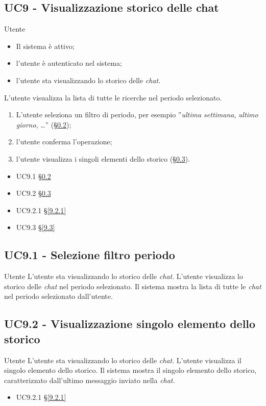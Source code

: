 \subsection{UC9 - Visualizzazione storico delle chat}
\label{9}
\makeUC{}
{Utente}
{
    \begin{itemize}
        \item Il sistema è attivo;
        \item l'utente è autenticato nel sistema;
        \item l'utente sta visualizzando lo storico delle \textit{chat}.
    \end{itemize}
}
{
    L'utente visualizza la lista di tutte le ricerche nel periodo selezionato.
}
{
    \begin{enumerate}
        \item L'utente seleziona un filtro di periodo, per esempio ''\textit{ultima settimana}, \textit{ultimo giorno}, \dots'' (§\ref{9.1});
        \item l'utente conferma l'operazione;
        \item l'utente visualizza i singoli elementi dello storico (§\ref{9.2}).
    \end{enumerate}
}
{
    \begin{itemize}
        \item UC9.1 §\ref{9.1}
        \item UC9.2 §\ref{9.2}
        \item UC9.2.1 §\ref{9.2.1}
        \item UC9.3 §\ref{9.3}
    \end{itemize}
}
{}
{}
{}

\subsection{UC9.1 - Selezione filtro periodo}
\label{9.1}
\makeUC{}
{Utente}
{L'utente sta visualizzando lo storico delle \textit{chat}.}
{L'utente visualizza lo storico delle \textit{chat} nel periodo selezionato.}
{Il sistema mostra la lista di tutte le \textit{chat} nel periodo selezionato 
dall'utente.}{}{}{}{}

\subsection{UC9.2 - Visualizzazione singolo elemento dello storico}
\label{9.2}
\makeUC{}
{Utente}
{L'utente sta visualizzando lo storico delle \textit{chat}.}
{L'utente visualizza il singolo elemento dello storico.}
{Il sistema mostra il singolo elemento dello storico, caratterizzato dall'ultimo messaggio 
inviato nella \textit{chat}.
}{
    \begin{itemize}
        \item UC9.2.1 §\ref{9.2.1}
    \end{itemize}
}{}{}{}

